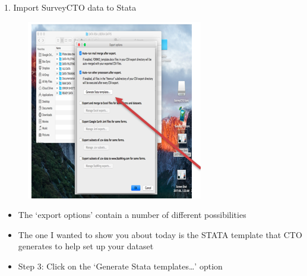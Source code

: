 \documentclass[aspectratio=169]{beamer}
\begin{document}
\begin{frame}[fragile]{1. Import SurveyCTO data to Stata}
\begin{multicols}{2}	
	\begin{figure}
		\centering
		\includegraphics[width=\linewidth]{img/scto3}
	\end{figure}
	\begin{itemize}
		\item The ‘export options’ contain a number of different possibilities
		\item The one I wanted to show you about today is the STATA template that CTO generates to help set up your dataset
		\item Step 3: Click on the ‘Generate Stata templates…’ option	 
	\end{itemize}
\end{multicols}
\end{frame}
\end{document}

